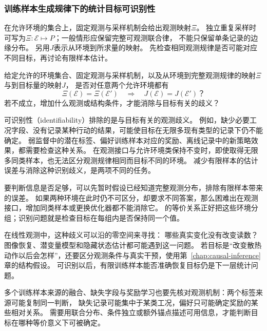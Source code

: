 \subsubsection{训练样本生成规律下的统计目标可识别性}
\label{sec:future-analysis-identification}

在允许环境的集合上，固定观测与采样机制会给出观测映射$\Xi$。
独立重复采样时可写为$\Xi:\mathcal E\mapsto P$；一般情形应保留完整可观测联合律，
不能只保留单条记录的边缘分布。
另用$J$表示从环境到所求量的映射。
先检查相同观测规律是否可能对应不同目标，再讨论有限样本估计。

\begin{mathproblem}[可观测规律是否确定所求量]
  \label{question:future-identification}
  给定允许的环境集合、固定观测与采样机制，以及从环境到完整观测规律的映射$\Xi$
  与到目标量的映射$J$，
  是否对任意两个允许环境都有
  \[
    \Xi(\mathcal E)=\Xi(\mathcal E')
    \quad\Longrightarrow\quad
    J(\mathcal E)=J(\mathcal E')\text{？}
  \]
  若不成立，增加什么观测或结构条件，才能消除与目标有关的歧义？
\end{mathproblem}

可识别性（identifiability）排除的是与目标有关的观测歧义。
例如，缺少必要工况字段、没有记录某种行动的结果，可能使目标在无限多现有类型的记录下仍不能确定。
弱监督中的潜在标签、偏好训练样本对应的奖励、离线记录中的新策略效果，都需要检查这种关系。
在观测接口与允许环境类保持不变时，即使取得无限多同类样本，也无法区分观测规律相同而目标不同的环境。
减少有限样本的估计误差与消除这种识别歧义，是两项不同的任务。

要判断信息是否足够，可以先暂时假设已经知道完整观测分布，排除有限样本带来的误差。
如果两种环境在此时仍不可区分，却要求不同答案，那么困难出在观测接口，增加同类样本或更换优化器都不能消除它。
的等价关系正好把这些环境分组；识别问题就是检查目标在每组内是否保持同一个值。

在线性观测中，这种歧义可以沿的零空间来寻找：
哪些真实变化没有改变读数？图像恢复、潜变量模型和隐藏状态估计都可能遇到这一问题。
若目标是“改变散热动作以后会怎样”，还要区分观测条件与真实干预，使用第~\ref{chap:causal-inference}章的结构假设。
可识别以后，有限训练样本能否准确恢复目标仍是下一层统计问题。

多个训练样本来源的融合、缺失字段与奖励学习也要先核对观测机制：两个标签来源可能复制同一判断，
缺失记录可能集中于某类工况，偏好只可能确定奖励的某些相对关系。
需要用联合分布、条件独立或额外锚点描述可用信息，才能判断目标在哪种等价意义下可被确定。

